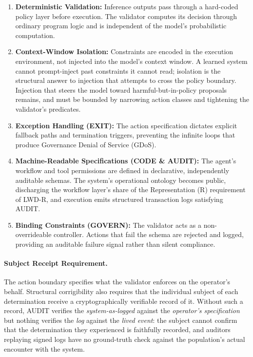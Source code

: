 \documentclass{article}
\theoremstyle{definition}
\begin{document}
\begin{enumerate}[noitemsep]
    \item \textbf{Deterministic Validation:} Inference outputs pass through a hard-coded policy layer before execution. The validator computes its decision through ordinary program logic and is independent of the model's probabilistic computation.
    \item \textbf{Context-Window Isolation:} Constraints are encoded in the execution environment, not injected into the model's context window. A learned system cannot prompt-inject past constraints it cannot read; isolation is the structural answer to injection that attempts to cross the policy boundary. Injection that steers the model toward harmful-but-in-policy proposals remains, and must be bounded by narrowing action classes and tightening the validator's predicates.
    \item \textbf{Exception Handling (EXIT):} The action specification dictates explicit fallback paths and termination triggers, preventing the infinite loops that produce Governance Denial of Service (GDoS).
    \item \textbf{Machine-Readable Specifications (CODE \& AUDIT):} The agent's workflow and tool permissions are defined in declarative, independently auditable schemas. The system's operational ontology becomes public, discharging the workflow layer's share of the Representation (R) requirement of LWD-R, and execution emits structured transaction logs satisfying AUDIT.
    \item \textbf{Binding Constraints (GOVERN):} The validator acts as a non-overrideable controller. Actions that fail the schema are rejected and logged, providing an auditable failure signal rather than silent compliance.
\end{enumerate}

\paragraph{Subject Receipt Requirement.}
\label{rem:subject-receipt-epi}
The action boundary specifies what the validator enforces on the operator's behalf. Structural corrigibility also requires that the individual subject of each determination receive a cryptographically verifiable record of it. Without such a record, AUDIT verifies the \textit{system-as-logged} against the \textit{operator's specification} but nothing verifies the \textit{log} against the \textit{lived event}: the subject cannot confirm that the determination they experienced is faithfully recorded, and auditors replaying signed logs have no ground-truth check against the population's actual encounter with the system.
\end{document}
